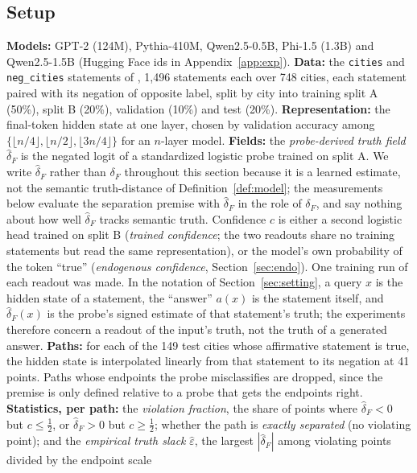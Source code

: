 \documentclass[10pt]{article}
\theoremstyle{definition}
\theoremstyle{remark}
\newcommand{\conf}{c}
\newcommand{\dF}{\delta_{\!F}}
\newcommand{\dFhat}{\hat\delta_{\!F}}
\begin{document}
\subsection{Setup}
\label{sec:setup}

\textbf{Models:} GPT-2 (124M), Pythia-410M, Qwen2.5-0.5B, Phi-1.5 (1.3B)
and Qwen2.5-1.5B (Hugging Face ids in Appendix~\ref{app:exp}).
\textbf{Data:} the \texttt{cities} and \texttt{neg\_cities} statements of
\citet{marks2024geometry}, 1{,}496 statements each over 748 cities, each
statement paired with its negation of opposite label, split by city into
training split A (50\%), split B (20\%), validation (10\%) and test (20\%).
\textbf{Representation:} the final-token hidden state at one layer, chosen
by validation accuracy among $\{\lfloor n/4\rfloor,\lfloor n/2\rfloor,
\lfloor 3n/4\rfloor\}$ for an $n$-layer model.
\textbf{Fields:} the \emph{probe-derived truth field} $\dFhat$ is the
negated logit of a standardized logistic probe trained on split A. We
write $\dFhat$ rather than $\dF$ throughout this section because it is a
learned estimate, not the semantic truth-distance of
Definition~\ref{def:model}; the measurements below evaluate the
separation premise with $\dFhat$ in the role of $\dF$, and say nothing
about how well $\dFhat$ tracks semantic truth. Confidence $\conf$ is either a second logistic
head trained on split B (\emph{trained confidence}; the two readouts share
no training statements but read the same representation), or the model's
own probability of the token ``true'' (\emph{endogenous confidence},
Section~\ref{sec:endo}). One training run of each readout was made.
In the notation of Section~\ref{sec:setting}, a query $x$ is the hidden
state of a statement, the ``answer'' $a(x)$ is the statement itself, and
$\dFhat(x)$ is the probe's signed estimate of that statement's truth; the
experiments therefore concern a readout of the input's truth, not the
truth of a generated answer.
\textbf{Paths:} for each of the 149 test cities whose affirmative
statement is true, the hidden state is interpolated linearly from that
statement to its negation at 41 points. Paths whose endpoints the probe
misclassifies are dropped, since the premise is only defined relative to
a probe that gets the endpoints right.
\textbf{Statistics, per path:} the \emph{violation fraction}, the share of
points where $\dFhat<0$ but $\conf\le\tfrac12$, or $\dFhat>0$ but
$\conf\ge\tfrac12$; whether the path is \emph{exactly separated} (no
violating point); and the \emph{empirical truth slack} $\hat\varepsilon$,
the largest $|\dFhat|$ among violating points divided by the endpoint scale
\end{document}
